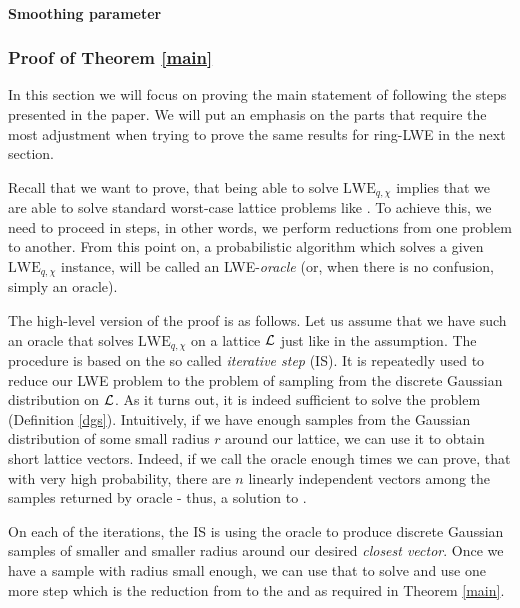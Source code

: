 \paragraph{Smoothing parameter}

\subsubsection*{Proof of Theorem \ref{main}}
In this section we will focus on proving the main statement of \cite{regev} following the steps presented in the paper. We will put an emphasis on the parts that require the most adjustment when trying to prove the same results for ring-LWE in the next section.

Recall that we want to prove, that being able to solve $\text{LWE}_{q, \chi}$ implies that we are able to solve standard worst-case lattice problems like . To achieve this, we need to proceed in steps, in other words, we perform reductions from one problem to another. From this point on, a probabilistic algorithm which solves a given $\text{LWE}_{q, \chi}$ instance, will be called an LWE-\textit{oracle} (or, when there is no confusion, simply an oracle).

The high-level version of the proof is as follows. Let us assume that we have such an oracle that solves $\text{LWE}_{q, \chi}$ on a lattice $\mathcal{L}$ just like in the assumption. The procedure is based on the so called \textit{iterative step} (IS). It is repeatedly used to reduce our LWE problem to the problem of sampling from the  discrete Gaussian distribution on $\mathcal{L}$. As it turns out, it is indeed sufficient to solve the  problem (Definition \ref{dgs}). Intuitively, if we have enough samples from the Gaussian distribution of some small radius $r$ around our lattice, we can use it to obtain short lattice vectors. Indeed, if we call the  oracle enough times we can prove, that with very high probability, there are $n$ linearly independent vectors among the samples returned by oracle - thus, a solution to .

On each of the iterations, the IS is using the oracle to produce discrete Gaussian samples of smaller and smaller radius around our desired \textit{closest vector}. Once we have a sample with radius small enough, we can use that to solve  and use one more step which is the reduction from  to the  and  as required in Theorem \ref{main}.

\begin{center}
\end{center}


